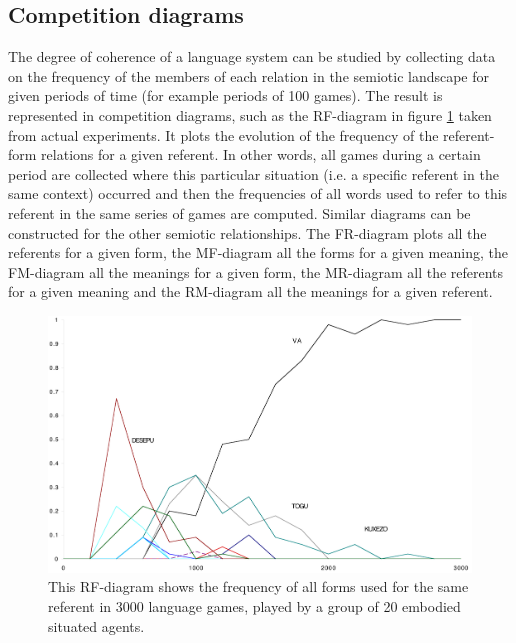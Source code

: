 \subsection{Competition diagrams}

The degree of coherence of a language system can be studied
by collecting data on the frequency of the members of 
each relation in the semiotic landscape for given periods of time
(for example periods of 100 games). The result is represented in
competition diagrams, such as the RF-diagram in figure
\ref{RF-diagram} taken from actual experiments. 
It plots the evolution of the frequency
of the referent-form relations for a given
referent. In other words, all games during a certain 
period are collected where this particular situation (i.e. 
a specific referent in the same context) occurred 
and then the frequencies of all words used to refer 
to this referent in the same series of games are computed. 
Similar diagrams can be constructed for the other
semiotic relationships. The FR-diagram plots all the referents
for a given form, the MF-diagram all the forms for a 
given meaning, the FM-diagram all the meanings for a 
given form, the MR-diagram all the referents for a given 
meaning and the RM-diagram all the meanings for a given 
referent. 
\begin{figure}[htbp]
  \centerline{\includegraphics[width=.80\textwidth]{chap7/figs/rf}}
\caption{ \label{RF-diagram} This RF-diagram shows
the frequency of all forms used for the same referent in 
3000 language games, played by a group of 20 embodied
situated agents.}
\end{figure}

